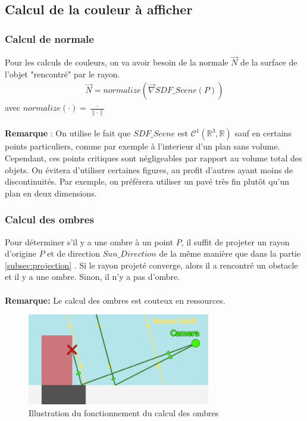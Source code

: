 \newpage
\subsection{Calcul de la couleur à afficher}
\subsubsection{Calcul de normale}
Pour les calculs de couleurs, on va avoir besoin de la normale $\Vec{N}$ de la surface de l'objet "rencontré" par le rayon.
\begin{align*}
    \Vec{N}=normalize(\Vec{\nabla}SDF\_Scene(P))
\end{align*}
avec $normalize(\cdot )=\frac{\cdot }{\|\cdot \|}$\\
\\
\textbf{Remarque} : On utilise le fait que $SDF\_Scene$ est $\mathcal{C}^1(\mathbb{R}^3,\mathbb{R})$ sauf en certains points particuliers, comme par exemple à l'interieur d'un plan sans volume. Cependant, ces points critiques sont négligeables par rapport au volume total des objets. On évitera d'utiliser certaines figures, au profit d'autres ayant moins de discontinuités. Par exemple, on préférera utiliser un pavé très fin plutôt qu'un plan en deux dimensions.

\subsubsection{Calcul des ombres}
Pour déterminer s'il y a une ombre à un point $P$, il suffit de projeter un rayon d'origine $P$ et de direction $Sun\_Direction$ de la même manière que dans la partie \ref{subsec:projection} . Si le rayon projeté converge, alors il a rencontré un obstacle et il y a une ombre. Sinon, il n'y a pas d'ombre.\\
\\\textbf{Remarque:} Le calcul des ombres est couteux en ressources.

\begin{figure}[h]
    \centering
    \includegraphics[width=8cm]{images/ombres.jpg}
    \caption{Illustration du fonctionnement du calcul des ombres}
    \label{fig:ombres}
\end{figure}

